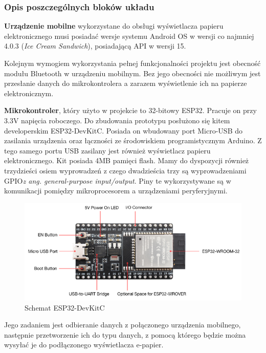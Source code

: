 \documentclass[a4paper,12pt, twoside]{article}
\begin{document}
    \subsubsection{Opis poszczególnych bloków układu}
    \textbf{Urządzenie mobilne} wykorzystane do obsługi wyświetlacza papieru elektronicznego musi posiadać wersje systemu Android OS w wersji co najmniej 4.0.3 (\textit{Ice Cream Sandwich})\cite{ics}, posiadającą API w wersji 15\cite{api}. 
    
    Kolejnym wymogiem wykorzystania pełnej funkcjonalności projektu jest obecność modułu Bluetooth w urządzeniu mobilnym. Bez jego obecności nie możliwym jest przesłanie danych do mikrokontrolera a zarazem wyświetlenie ich na papierze elektronicznym.
    
    \vspace{1cm}
    
	\textbf{Mikrokontroler}, który użyto w projekcie to 32-bitowy ESP32. Pracuje on przy 3.3V napięcia roboczego. Do zbudowania prototypu posłużono się kitem developerskim ESP32-DevKitC. Posiada on wbudowany port Micro-USB do zasilania urządzenia oraz łączności ze środowiskiem programistycznym Arduino. Z tego samego portu USB zasilany jest również wyświetlacz papieru elektronicznego. Kit posiada 4MB pamięci flash\cite{flash}. Mamy do dyspozycji również trzydzieści osiem wyprowadzeń z czego dwadzieścia trzy są wyprowadzeniami GPIO\textit{z ang. general-purpose input/output}. Piny te wykorzystywane są w komunikacji pomiędzy mikroprocesorem a urządzeniami peryferyjnymi.
	\vspace{.5cm}
	\begin{figure}[H]
	        \centering
			\vspace{.5cm}
			\includegraphics[width=14cm]{images/rys8_devkit.png}
			\vspace{.5cm}
			\caption{Schemat ESP32-DevKitC\cite{devkit}}
            \label{fig:devkit}
	\end{figure}
	\vspace{.5cm}
	Jego zadaniem jest odbieranie danych z połączonego urządzenia mobilnego, następnie przetworzenie ich do typu danych, z pomocą którego będzie można wysyłać je do podłączonego wyświetlacza e-papier.
	
\end{document}
